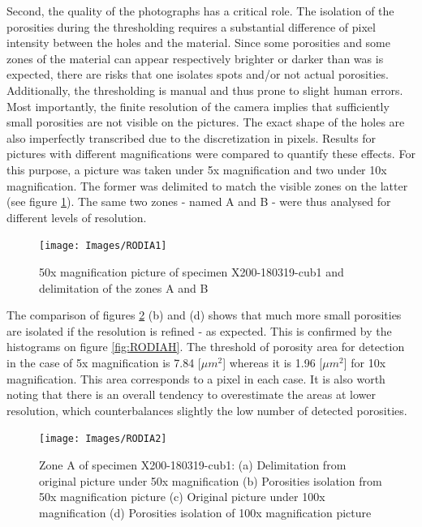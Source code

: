 Second, the quality of the photographs has a critical role. The isolation of the porosities during the thresholding requires a substantial difference of pixel intensity between the holes and the material. Since some porosities and some zones of the material can appear respectively brighter or darker than was is expected, there are risks that one isolates spots and/or not actual porosities. Additionally, the thresholding is manual and thus prone to slight human errors. \\

Most importantly, the finite resolution of the camera implies that sufficiently small porosities are not visible on the pictures. The exact shape of the holes are also imperfectly transcribed due to the discretization in pixels. Results for pictures with different magnifications were compared to quantify these effects. For this purpose, a picture was taken under 5x magnification and two under 10x magnification. The former was delimited to match the visible zones on the latter (see figure \ref{fig:RODIA1}). The same two zones - named A and B - were thus analysed for different levels of resolution.\\

\begin{figure}[th]
\centering
\centerline{\texttt{[image: Images/RODIA1]}}
\decoRule
\caption[50x magnification picture of specimen X200-180319-cub1 and delimitation of the zones A and B]{50x magnification picture of specimen X200-180319-cub1 and delimitation of the zones A and B}
\label{fig:RODIA1}
\end{figure}

The comparison of figures \ref{fig:RODIA2} (b) and (d) shows that much more small porosities are isolated if the resolution is refined - as expected. This is confirmed by the histograms on figure \ref{fig:RODIAH}. The threshold of porosity area for detection in the case of 5x magnification is 7.84 [$\mu m^2$] whereas it is 1.96 [$\mu m^2$] for 10x magnification. This area corresponds to a pixel in each case. It is also worth noting that there is an overall tendency to overestimate the areas at lower resolution, which counterbalances slightly the low number of detected porosities. \\

\begin{figure}[th]
\centering
\centerline{\texttt{[image: Images/RODIA2]}}
\decoRule
\caption[Zone A of specimen X200-180319-cub1: (a) Delimitation from original picture under 50x magnification (b) Porosities isolation from 50x magnification picture (c) Original picture under 100x magnification (d) Porosities isolation of 100x magnification picture]{Zone A of specimen X200-180319-cub1: (a) Delimitation from original picture under 50x magnification (b) Porosities isolation from 50x magnification picture (c) Original picture under 100x magnification (d) Porosities isolation of 100x magnification picture}
\label{fig:RODIA2}
\end{figure}

